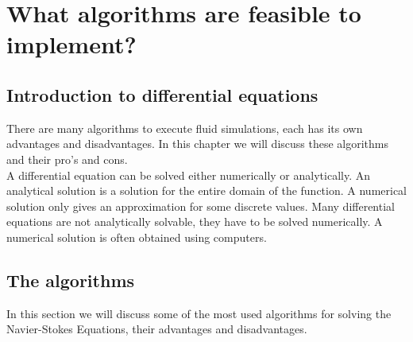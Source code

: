 \documentclass{article}
\begin{document}
\newpage
\section{What algorithms are feasible to implement?}
\subsection{Introduction to differential equations}
There are many algorithms to execute fluid simulations, each has its own advantages and disadvantages. In this chapter we will discuss these algorithms and their pro's and cons. 
\\

A differential equation can be solved either numerically or analytically. An analytical solution is a solution for the entire domain of the function. A numerical solution only gives an approximation for some discrete values.  Many differential equations are not analytically solvable, they have to be solved numerically. A numerical solution is often obtained using computers. \cite{What is discretization}




\subsection{The algorithms}
In this section we will discuss some of the most used algorithms for solving the Navier-Stokes Equations, their advantages and disadvantages. 
\end{document}
